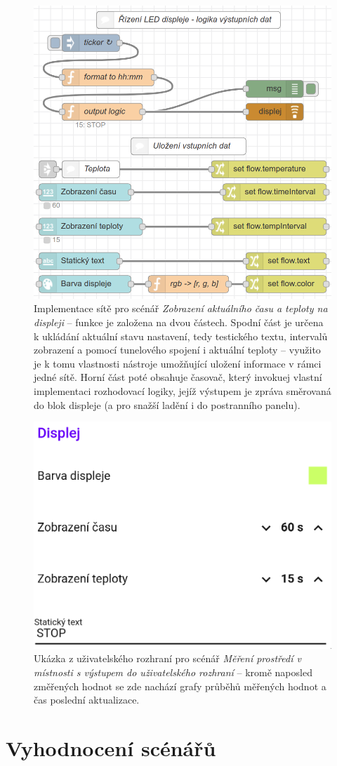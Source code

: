 \begin{figure}
    \centering
    \includegraphics[width=.7\textwidth]{figures/fis-flow-2.png}
    \caption{Implementace sítě pro scénář \textit{Zobrazení aktuálního času a teploty na displeji} -- funkce je
    založena na dvou částech.
    Spodní část je určena k ukládání aktuální stavu nastavení, tedy testického textu, intervalů zobrazení a pomocí
    tunelového spojení i aktuální teploty -- využito je k tomu vlastnosti nástroje umožňující uložení informace v
    rámci jedné sítě.
    Horní část poté obsahuje časovač, který invokuej vlastní implementaci rozhodovací logiky, jejíž výstupem je
    zpráva směrovaná do blok displeje (a pro snažší ladění i do postranního panelu).}
    \label{fig:node-red-production-2}
\end{figure}
\begin{figure}
    \centering
    \includegraphics[width=.5\textwidth]{figures/fis-flow-2-ui.png}
    \caption{Ukázka z uživatelského rozhraní pro scénář \textit{Měření prostředí v místnosti s výstupem do
    uživatelského rozhraní} -- kromě naposled změřených hodnot se zde nachází grafy průběhů měřených hodnot a čas
    poslední aktualizace.}
    \label{fig:node-red-production-2-ui}
\end{figure}

\section{Vyhodnocení scénářů}\label{sec:vyhodnocení}
